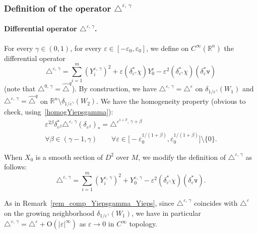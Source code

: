 \documentclass[AHL,Unicode,published]{cedram}
\newcommand*\R{\mathbb{R}}
\newcommand{\ttv}{\mathtt{v}}
\newcommand{\rmO}{\mathrm{O}}
\let\oldforall\forall
\renewcommand*{\forall}{\mathrel{\oldforall}}
\begin{document}
\subsubsection{Definition of the operator \texorpdfstring{$\triangle^{\varepsilon,\,\gamma}$}{triangle varepsilon, gamma}}\label{sec_def_deltaepsgam}
\paragraph{Differential operator $\triangle^{\varepsilon,\,\gamma}$.} For every $\gamma\in(0,1)$, for every $\varepsilon\in[-\varepsilon_0,\varepsilon_0]$, we define on $C^\infty(\R^n)$ the differential operator
\begin{equation}\label{def_triangleepsgamma}
\triangle^{\varepsilon,\,\gamma} = \sum_{i=1}^m \left(Y^{\varepsilon,\,\gamma}_i \right)^2 + \varepsilon \left(\delta_{\varepsilon^\gamma}^*\chi\right) Y^\varepsilon_0 - \varepsilon^2 \left(\delta_{\varepsilon^\gamma}^*\chi\right)\left(\delta_\varepsilon^*\ttv \right)
\end{equation}
(note that $\triangle^{0,\,\gamma} = \widehat{\triangle}^{q}$). By construction, we have $\triangle^{\varepsilon,\,\gamma} = \triangle^\varepsilon$ on $\delta_{1/\varepsilon^\gamma}(W_1)$ and $\triangle^{\varepsilon,\,\gamma} = \widehat{\triangle}^{q}$ on $\R^n\setminus\delta_{1/\varepsilon^\gamma}(W_2)$. We have the homogeneity property (obvious to check, using~\eqref{homogYiepsgamma}):
\begin{multline}\label{homog_deltaepsgamma}
\varepsilon^{2\beta} \delta_{\varepsilon^\beta}^* \triangle^{\varepsilon,\,\gamma} \left(\delta_{\varepsilon^\beta}\right)_* = \triangle^{\varepsilon^{1+\beta},\,\gamma+\beta} \\
\forall\beta\in(\gamma-1,\gamma) \qquad\forall \varepsilon\in\big[-\varepsilon_0^{1/(1+\beta)},\varepsilon_0^{1/(1+\beta)}\big]\setminus\{0\}.
\end{multline}

When $X_0$ is a smooth section of $D^2$ over $M$, we modify the definition of $\triangle^{\varepsilon,\,\gamma}$ as follows:
\[
\triangle^{\varepsilon,\,\gamma} = \sum_{i=1}^m \left(Y^{\varepsilon,\,\gamma}_i \right)^2 + Y^{\varepsilon,\,\gamma}_0 - \varepsilon^2 (\delta_{\varepsilon^\gamma}^*\chi) \left(\delta_\varepsilon^*\ttv \right).
\]

\begin{rema}\label{rem_comp_triangleepsgamma_triangleeps}
As in Remark~\ref{rem_comp_Yiepsgamma_Yieps}, since $\triangle^{\varepsilon,\,\gamma}$ coincides with $\triangle^\varepsilon$ on the growing neighborhood $\delta_{1/\varepsilon^\gamma}(W_1)$, we have in particular $\triangle^{\varepsilon,\,\gamma} = \triangle^\varepsilon + \rmO(\vert\varepsilon\vert^\infty)$ as $\varepsilon\rightarrow 0$ in $C^\infty$ topology.
\end{rema}
\end{document}
